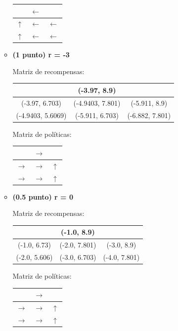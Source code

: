 \documentclass[a4paper,10pt]{article}
\begin{document}
\begin{enumerate}
\begin{itemize}
\begin{tabular}{|c|c|c|}
\hline
 & $\leftarrow$ & \\ \hline
$\uparrow$ & $\leftarrow$ & $\leftarrow$ \\ \hline
$\uparrow$ & $\leftarrow$ & $\leftarrow$ \\ \hline
\end{tabular}

		\item \textbf{(1 punto)  r = -3}
		
Matriz de recompensas:

\begin{tabular}{|c|c|c|}
\hline
 & (-3.97, 8.9) & \\ \hline
(-3.97, 6.703) & (-4.9403, 7.801) & (-5.911, 8.9) \\ \hline
(-4.9403, 5.6069) & (-5.911, 6.703) & (-6.882, 7.801) \\ \hline
\end{tabular}

Matriz de políticas:

\begin{tabular}{|c|c|c|}
\hline
 & $\rightarrow$ & \\ \hline
$\rightarrow$ & $\rightarrow$ & $\uparrow$ \\ \hline
$\rightarrow$ & $\rightarrow$ & $\uparrow$ \\ \hline
\end{tabular}

		\item \textbf{(0.5 punto) r = 0}
		
Matriz de recompensas:

\begin{tabular}{|c|c|c|}
\hline
& (-1.0, 8.9) & \\ \hline
(-1.0, 6.73) & (-2.0, 7.801) & (-3.0, 8.9) \\ \hline
(-2.0, 5.606) & (-3.0, 6.703) & (-4.0, 7.801) \\ \hline
\end{tabular}

Matriz de políticas:

\begin{tabular}{|c|c|c|}
\hline
 & $\rightarrow$ & \\ \hline
$\rightarrow$ & $\rightarrow$ & $\uparrow$ \\ \hline
$\rightarrow$ & $\rightarrow$ & $\uparrow$ \\ \hline
\end{tabular}


\end{itemize}
\end{enumerate}
\end{document}
